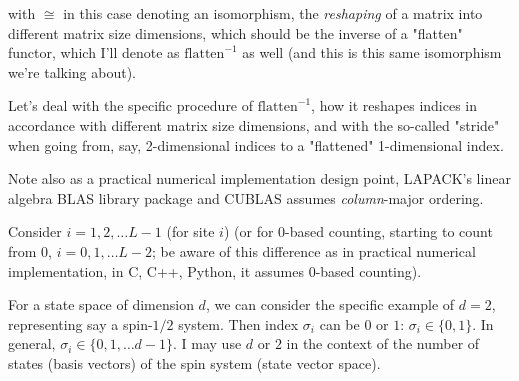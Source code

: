 with $\cong$ in this case denoting an isomorphism, the \emph{reshaping} of a matrix into different matrix size dimensions, which should be the inverse of a "flatten" functor, which I'll denote as $\text{flatten}^{-1}$ as well (and this is this same isomorphism we're talking about).  

Let's deal with the specific procedure of $\text{flatten}^{-1}$, how it reshapes indices in accordance with different matrix size dimensions, and with the so-called "stride" when going from, say, 2-dimensional indices to a "flattened" 1-dimensional index.  

Note also as a practical numerical implementation design point, LAPACK's linear algebra BLAS library package and CUBLAS assumes \emph{column}-major ordering.  

Consider $i= 1,2,\dots L-1$ (for site $i$) (or for $0$-based counting, starting to count from $0$, $i=0,1,\dots L-2$; be aware of this difference as in practical numerical implementation, in C, C++, Python, it assumes $0$-based counting).  

For a state space of dimension $d$, we can consider the specific example of $d=2$, representing say a spin-$1/2$ system.  Then index $\sigma_i$ can be $0$ or $1$: $\sigma_i \in \lbrace 0 ,1\rbrace$.  In general, $\sigma_i \in \lbrace 0 ,1, \dots d-1\rbrace$.  I may use $d$ or $2$ in the context of the number of states (basis vectors) of the spin system (state vector space).  

